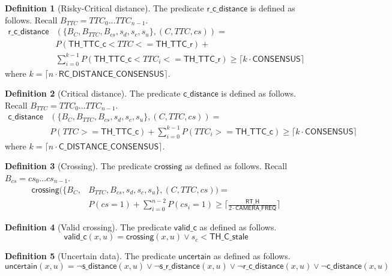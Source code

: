 \documentclass[12pt]{article}
\theoremstyle{definition}
\newtheorem{definition}{Definition}[section]
\begin{document}
\begin{definition}[Risky-Critical distance]
The predicate $\mathsf{r\_c\_distance}$ is defined as follows. Recall $B_{TTC} = TTC_0 \ldots TTC_{n-1}$.
\[
    \begin{aligned}
        \mathsf{r\_c\_distance}&(\{B_C, B_{TTC}, B_{cs}, s_d, s_c, s_u\}, (C,TTC,cs)) = \\ 
        &P(\mathsf{TH\_TTC\_c} < TTC <= \mathsf{TH\_TTC\_r}) + \\
        &\sum_{i=0}^{k-1} P(\mathsf{TH\_TTC\_c} < TTC_i <= \mathsf{TH\_TTC\_r}) \geq \lceil k \cdot \mathsf{CONSENSUS}\rceil
    \end{aligned}
\]
where $k = \lceil n \cdot \mathsf{RC\_DISTANCE\_CONSENSUS} \rceil$.    
\end{definition}

\begin{definition}[Critical distance]
The predicate $\mathsf{c\_distance}$ is defined as follows. Recall $B_{TTC} = TTC_0 \ldots TTC_{n-1}$.
\[
    \begin{aligned}
        \mathsf{c\_distance}&(\{B_C, B_{TTC}, B_{cs}, s_d, s_c, s_u\}, (C,TTC,cs)) = \\
        &P(TTC >= \mathsf{TH\_TTC\_c}) + \sum_{i=0}^{k-1} P(TTC_i >= \mathsf{TH\_TTC\_c}) \geq \lceil k \cdot \mathsf{CONSENSUS}\rceil
    \end{aligned}
\]
where $k = \lceil n \cdot \mathsf{C\_DISTANCE\_CONSENSUS} \rceil$.    
\end{definition}

\begin{definition}[Crossing]
    The predicate $\mathsf{crossing}$ as defined as follows. Recall $B_{cs} = cs_0 \ldots cs_{n-1}$.
    \[
        \begin{aligned}
            \mathsf{crossing}(\{B_C, &B_{TTC}, B_{cs}, s_d, s_c, s_u\}, (C,TTC,cs)) = \\ 
            &P(cs = 1) + \sum_{i=0}^{n-2} P(cs_i = 1) \geq \lceil \frac{\mathsf{RT\_H}}{ 2 \cdot \mathsf{CAMERA\_FREQ}} \rceil
        \end{aligned}
    \]
\end{definition}

\begin{definition}[Valid crossing]
    The predicate $\mathsf{valid\_c}$ as defined as follows.
    \[
        \mathsf{valid\_c}(x, u) = \mathsf{crossing}(x, u) \lor s_c < \mathsf{TH\_C\_stale}
    \]
\end{definition}

\begin{definition}[Uncertain data]
    The predicate $\mathsf{uncertain}$ as defined as follows.
    \[
        \mathsf{uncertain}(x,u) = \neg \mathsf{s\_distance}(x,u) \lor \neg \mathsf{s\_r\_distance}(x,u) \lor \neg \mathsf{r\_c\_distance}(x,u) \lor \neg \mathsf{c\_distance}(x,u)
    \]
\end{definition}
\end{document}

